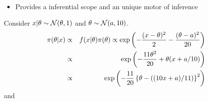 \begin{slide}
\begin{itemize}
\pause
\item Provides a {} inferential scope and an unique motor of inference
\end{itemize}

\end{slide}\begin{slide}
Consider $x|\theta \sim {\cal N}(\theta,1)$ and $\theta\sim{\cal N}(a,10)$.
\begin{eqnarray*}
\pi(\theta|x) & \propto &  f(x|\theta) \pi(\theta) \propto \exp \left(-{(x-\theta)^2 \over 2} - {(\theta-a)^2 \over 20}\right) \\
              & \propto &  \exp\left(-{11 \theta^2 \over 20}+\theta (x+a/10) \right) \\
              & \propto & \exp\left(-{11 \over 20}\left\{\theta-((10x+a)/11)\right\}^2\right) 
\end{eqnarray*}
\pause and 
{}
\fin

\end{slide}
